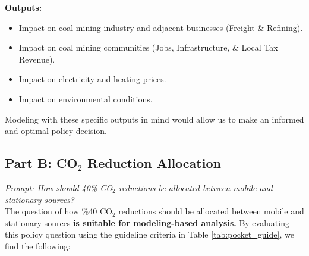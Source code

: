 \documentclass[journal, onecolumn, 12pt]{IEEEtran}
\begin{document}
\textbf{Outputs:}
\begin{itemize}
  \item Impact on coal mining industry and adjacent businesses (Freight \& Refining).
  \item Impact on coal mining communities (Jobs, Infrastructure, \& Local Tax Revenue).
  \item Impact on electricity and heating prices.
  \item Impact on environmental conditions.\\
\end{itemize}

Modeling with these specific outputs in mind would allow us to make an informed and optimal policy decision. 

\newpage
\subsection{Part B: CO$_2$ Reduction Allocation}
\textit{Prompt: How should 40\% CO$_2$ reductions be allocated between mobile and stationary sources?}\\

The question of how \%40 CO$_2$ reductions should be allocated between mobile and stationary sources \textbf{is suitable for modeling-based analysis.} By evaluating this policy question  using the guideline criteria in Table \ref{tab:pocket_guide}, we find the following:
\end{document}
